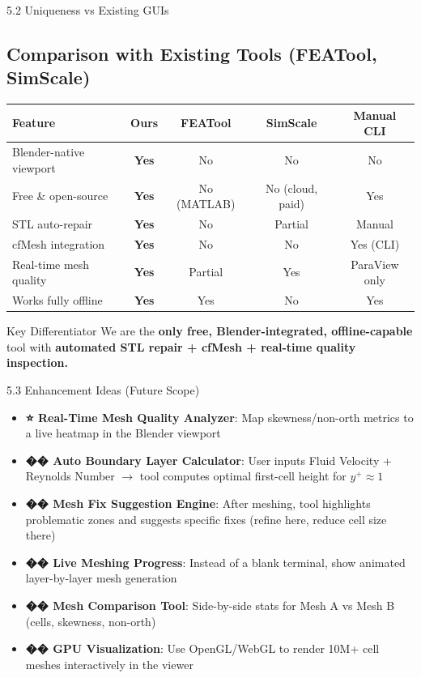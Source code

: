 \documentclass[dvipsnames,mathserif]{beamer}
\begin{document}
\begin{frame}{5.2 Uniqueness vs Existing GUIs}
    \subsection{Comparison with Existing Tools (FEATool, SimScale)}
    \begin{table}
    \centering
    \scriptsize
    \begin{tabular}{lcccc}
    \toprule
    \textbf{Feature} & \textbf{Ours} & \textbf{FEATool} & \textbf{SimScale} & \textbf{Manual CLI} \\
    \midrule
    Blender-native viewport & \textbf{Yes} & No & No & No \\
    Free \& open-source & \textbf{Yes} & No (MATLAB) & No (cloud, paid) & Yes \\
    STL auto-repair & \textbf{Yes} & No & Partial & Manual \\
    cfMesh integration & \textbf{Yes} & No & No & Yes (CLI) \\
    Real-time mesh quality & \textbf{Yes} & Partial & Yes & ParaView only \\
    Works fully offline & \textbf{Yes} & Yes & No & Yes \\
    \bottomrule
    \end{tabular}
    \end{table}
    \vspace{0.2cm}
    \begin{alertblock}{Key Differentiator}
        We are the \textbf{only free, Blender-integrated, offline-capable} tool with \textbf{automated STL repair + cfMesh + real-time quality inspection.}
    \end{alertblock}
\end{frame}

\begin{frame}{5.3 Enhancement Ideas (Future Scope)}
    \begin{itemize}
        \item \textbf{⭐ Real-Time Mesh Quality Analyzer}: Map skewness/non-orth metrics to a live heatmap in the Blender viewport
        \item \textbf{�� Auto Boundary Layer Calculator}: User inputs Fluid Velocity + Reynolds Number $\rightarrow$ tool computes optimal first-cell height for $y^+ \approx 1$
        \item \textbf{�� Mesh Fix Suggestion Engine}: After meshing, tool highlights problematic zones and suggests specific fixes (refine here, reduce cell size there)
        \item \textbf{�� Live Meshing Progress}: Instead of a blank terminal, show animated layer-by-layer mesh generation
        \item \textbf{�� Mesh Comparison Tool}: Side-by-side stats for Mesh A vs Mesh B (cells, skewness, non-orth)
        \item \textbf{�� GPU Visualization}: Use OpenGL/WebGL to render 10M+ cell meshes interactively in the viewer
    \end{itemize}
\end{frame}
\end{document}
